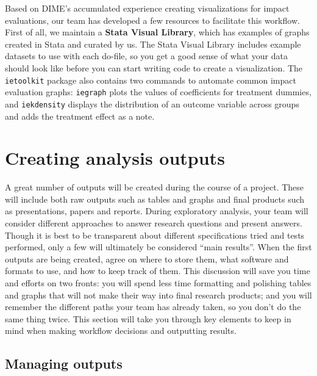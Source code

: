 Based on DIME's accumulated experience creating visualizations for impact evaluations, 
our team has developed a few resources to facilitate this workflow.
First of all, we maintain a \textbf{Stata Visual Library},
which has examples of graphs created in Stata and curated by us.
The Stata Visual Library includes example datasets to use with each do-file,
so you get a good sense of what your data should look like
before you can start writing code to create a visualization.
The \texttt{ietoolkit} package also contains two commands to automate
common impact evaluation graphs: 
\texttt{iegraph} plots the values of coefficients for treatment dummies,
and \texttt{iekdensity} displays the distribution of an outcome variable
across groups and adds the treatment effect as a note.


\section{Creating analysis outputs}

A great number of outputs will be created during the course of a project.
These will include both raw outputs such as tables and graphs
and final products such as presentations, papers and reports.
During exploratory analysis, your team will consider different approaches
to answer research questions and present answers.
Though it is best to be transparent about different
specifications tried and tests performed,
only a few will ultimately be considered ``main results''.
When the first outputs are being created, agree on where to store them,
what software and formats to use, and how to keep track of them.
This discussion will save you time and efforts on two fronts:
you will spend less time formatting and polishing tables and graphs that 
will not make their way into final research products;
and you will remember the different paths your team has already
taken, so you don't do the same thing twice.
This section will take you through key elements to keep in mind 
when making workflow decisions and outputting results.


\subsection{Managing outputs}

